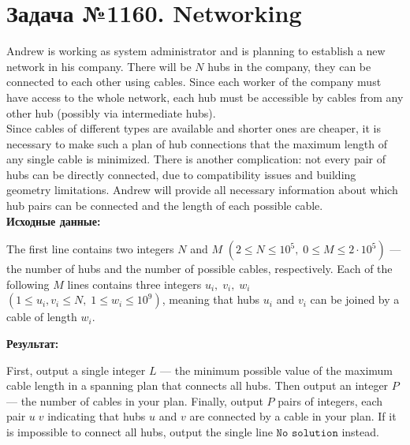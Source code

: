 \documentclass[a4paper,12pt]{article}
\begin{document}
\newpage
\section*{Задача №1160. Networking}
Andrew is working as system administrator and is planning to establish a new network in his company. There will be $N$ hubs in the company, they can be connected to each other using cables. Since each worker of the company must have access to the whole network, each hub must be accessible by cables from any other hub (possibly via intermediate hubs).\\[0.5em]
Since cables of different types are available and shorter ones are cheaper, it is necessary to make such a plan of hub connections that the maximum length of any single cable is minimized. There is another complication: not every pair of hubs can be directly connected, due to compatibility issues and building geometry limitations. Andrew will provide all necessary information about which hub pairs can be connected and the length of each possible cable.\\[1em]
\textbf{Исходные данные:}
\begin{quotebox}
    The first line contains two integers $N$ and $M$ $(2 \le N \le 10^5,\;0 \le M \le 2\cdot10^5)$ — the number of hubs and the number of possible cables, respectively. Each of the following $M$ lines contains three integers  $u_i,\;v_i,\;w_i$ $(1 \le u_i, v_i \le N,\; 1 \le w_i \le 10^9)$, meaning that hubs $u_i$ and $v_i$ can be joined by a cable of length $w_i$.
\end{quotebox}
\textbf{Результат:}
\begin{quotebox}
    First, output a single integer $L$ — the minimum possible value of the maximum cable length in a spanning plan that connects all hubs.  
    Then output an integer $P$ — the number of cables in your plan.  
    Finally, output $P$ pairs of integers, each pair $u\;v$ indicating that hubs $u$ and $v$ are connected by a cable in your plan. If it is impossible to connect all hubs, output the single line $\texttt{No solution}$ instead.
\end{quotebox}
\end{document}
